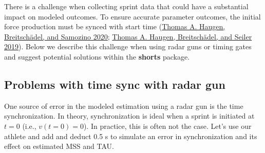 \documentclass[fleqn,10pt,lineno]{wlpeerj} %
\begin{document}
There is a challenge when collecting sprint data that could have a substantial impact on modeled outcomes. To ensure accurate parameter outcomes, the initial force production must be synced with start time (\protect\hyperlink{ref-haugenPowerForceVelocityProfilingSprinting2020}{Thomas A. Haugen, Breitschädel, and Samozino 2020}; \protect\hyperlink{ref-haugenSprintMechanicalVariables2019}{Thomas A. Haugen, Breitschädel, and Seiler 2019}). Below we describe this challenge when using radar guns or timing gates and suggest potential solutions within the \textbf{shorts} package.

\hypertarget{problems-with-time-sync-with-radar-gun}{%
\subsection{Problems with time sync with radar gun}\label{problems-with-time-sync-with-radar-gun}}

One source of error in the modeled estimation using a radar gun is the time synchronization. In theory, synchronization is ideal when a sprint is initiated at \(t=0\) (i.e., \(v(t=0) = 0\)). In practice, this is often not the case. Let's use our athlete and add and deduct 0.5 s to simulate an error in synchronization and its effect on estimated MSS and TAU.
\end{document}
